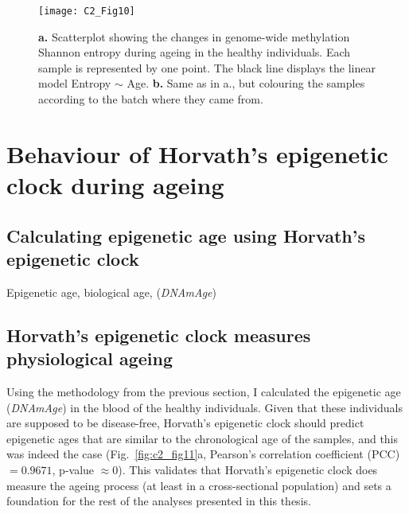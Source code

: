\begin{figure}[htbp!] 
	\centering
	\vspace*{2mm}    
	\texttt{[image: C2\_Fig10]}
	\caption[Genome-wide methylation Shannon entropy during ageing in the healthy individuals]{\textbf{a.} Scatterplot showing the changes in genome-wide methylation Shannon entropy during ageing in the healthy individuals. Each sample is represented by one point. The black line displays the linear model Entropy $\sim$ Age. \textbf{b.} Same as in a., but colouring the samples according to the batch where they came from.}
	\label{fig:c2_fig10}
\end{figure}


\smallskip

\section{Behaviour of Horvath's epigenetic clock during ageing}

\smallskip


\subsection{Calculating epigenetic age using Horvath's epigenetic clock}

\smallskip

Epigenetic age, biological age, (\textit{DNAmAge})

\smallskip


\subsection{Horvath's epigenetic clock measures physiological ageing}

\smallskip

Using the methodology from the previous section, I calculated the epigenetic age (\textit{\acrshort{DNAmAge}}) in the blood of the healthy individuals. Given that these individuals are supposed to be disease-free, Horvath's epigenetic clock should predict epigenetic ages that are similar to the chronological age of the samples, and this was indeed the case (Fig.~\ref{fig:c2_fig11}a, Pearson's correlation coefficient (\acrshort{PCC}) $= 0.9671$, p-value $\approx 0$). This validates that Horvath's epigenetic clock does measure the ageing process (at least in a cross-sectional population) and sets a foundation for the rest of the analyses presented in this thesis.

\bigskip

